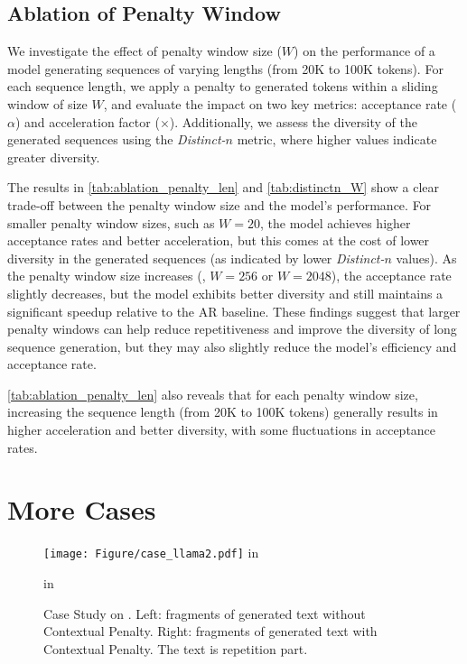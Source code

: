 \subsection{Ablation of Penalty Window}
\label{sec:ablation_W}
We investigate the effect of penalty window size ($W$) on the performance of a model generating sequences of varying lengths (from 20K to 100K tokens). For each sequence length, we apply a penalty to generated tokens within a sliding window of size $W$, and evaluate the impact on two key metrics: acceptance rate ($\alpha$) and acceleration factor ($\times$). Additionally, we assess the diversity of the generated sequences using the \textit{Distinct-$n$} metric, where higher values indicate greater diversity.





The results in \cref{tab:ablation_penalty_len} and \cref{tab:distinctn_W} show a clear trade-off between the penalty window size and the model's performance. For smaller penalty window sizes, such as $W=20$, the model achieves higher acceptance rates and better acceleration, but this comes at the cost of lower diversity in the generated sequences (as indicated by lower \textit{Distinct-$n$} values). As the penalty window size increases (\eg, $W=256$ or $W=2048$), the acceptance rate slightly decreases, but the model exhibits better diversity and still maintains a significant speedup relative to the AR baseline. These findings suggest that larger penalty windows can help reduce repetitiveness and improve the diversity of long sequence generation, but they may also slightly reduce the model's efficiency and acceptance rate.

\cref{tab:ablation_penalty_len} also reveals that for each penalty window size, increasing the sequence length (from 20K to 100K tokens) generally results in higher acceleration and better diversity, with some fluctuations in acceptance rates.

\section{More Cases}
\label{app:cases}
\begin{figure}[ht]
    \centering
    \texttt{[image: Figure/case\_llama2.pdf]}
     in
    \caption{Case Study on \yarnllama. Left: fragments of generated text without Contextual Penalty. Right: fragments of generated text with Contextual Penalty. The  text is repetition part.}
    \label{fig:case2}
     in
\end{figure}

